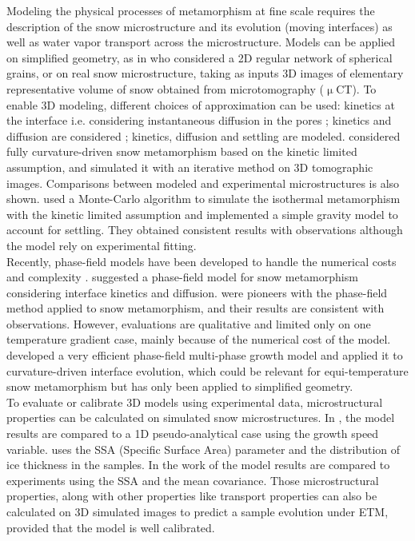 \documentclass[draft,ms]{agujournal2019}
\begin{document}
Modeling the physical processes of metamorphism at fine scale requires the  description of the snow microstructure and its evolution (moving interfaces) as well as water vapor transport across the microstructure. Models can be applied on simplified geometry, as in   who considered a 2D regular network of spherical grains, or on real snow microstructure, taking as inputs 3D images of elementary representative volume of snow obtained from microtomography ($\upmu$CT). To enable 3D modeling, different choices of approximation can be used: kinetics at the interface i.e. considering instantaneous diffusion in the pores ; kinetics and diffusion are considered ; kinetics, diffusion and settling are modeled.   considered fully curvature-driven snow metamorphism based on the kinetic limited assumption, and simulated it with an iterative method on 3D tomographic images. Comparisons between modeled and experimental microstructures is also shown.  used a Monte-Carlo algorithm to simulate the isothermal metamorphism with the kinetic limited assumption and implemented a simple gravity model to account for settling. They obtained consistent results with observations although the model rely on experimental fitting.\\
Recently, phase-field models have been developed to handle the numerical costs and complexity \cite{kaempfer_phase-field_2009, granger_physique_2019, bretin_phase-field_2019}.  suggested a phase-field model for snow metamorphism considering interface kinetics and diffusion.  were pioneers with the phase-field method applied to snow metamorphism, and their results are consistent with observations. However, evaluations are qualitative and limited only on one temperature gradient case, mainly because of the numerical cost of the model. 
 developed a very efficient phase-field multi-phase growth model and applied it to curvature-driven interface evolution, which could be relevant for equi-temperature snow metamorphism but has only been applied to simplified geometry.\\
%
To evaluate or calibrate 3D models using experimental data, microstructural properties can be calculated on simulated snow microstructures. In , the model results are compared to a 1D pseudo-analytical case using the growth speed variable.  uses the SSA (Specific Surface Area) parameter and the distribution of ice thickness in the samples. In the work of  the model results are compared to experiments using the SSA and the mean covariance. Those microstructural properties, along with other properties like transport properties can also be calculated on 3D simulated images to predict a sample evolution under ETM, provided that the model is well calibrated.\\
\end{document}

